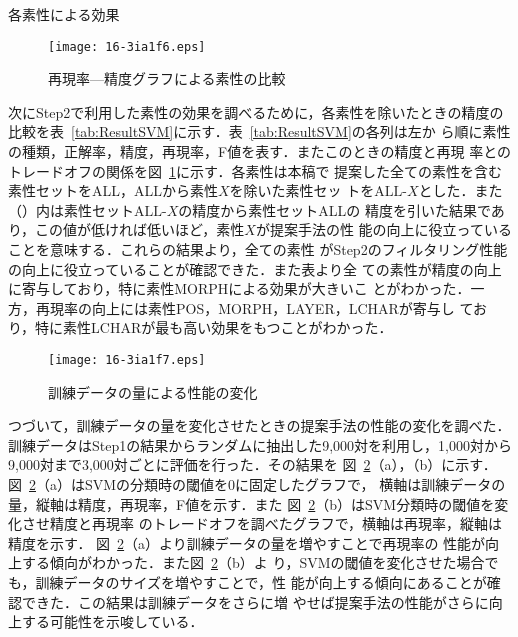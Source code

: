 \documentclass[japanese]{jnlp_1.4}
\begin{document}
\begin{table}[p]
    \caption{各素性による効果}
    \label{tab:ResultSVM}

\end{table}
\begin{figure}[p]
\begin{center}
\texttt{[image: 16-3ia1f6.eps]}
\end{center}
    \caption{再現率—精度グラフによる素性の比較}
    \label{fig:rp_feature}
\end{figure}

次にStep2で利用した素性の効果を調べるために，各素性を除いたときの精度の
比較を表~\ref{tab:ResultSVM}に示す．表~\ref{tab:ResultSVM}の各列は左か
ら順に素性の種類，正解率，精度，再現率，F値を表す．またこのときの精度と再現
率とのトレードオフの関係を図~\ref{fig:rp_feature}に示す．各素性は本稿で
提案した全ての素性を含む素性セットをALL，ALLから素性$X$を除いた素性セッ
トを$\text{ALL-}X$とした．また（）内は素性セット$\text{ALL-}X$の精度から素性セットALLの
精度を引いた結果であり，この値が低ければ低いほど，素性$X$が提案手法の性
能の向上に役立っていることを意味する．これらの結果より，全ての素性
がStep2のフィルタリング性能の向上に役立っていることが確認できた．また表より全
ての素性が精度の向上に寄与しており，特に素性MORPHによる効果が大きいこ
とがわかった．一方，再現率の向上には素性POS，MORPH，LAYER，LCHARが寄与し
ており，特に素性LCHARが最も高い効果をもつことがわかった．


\begin{figure}[b]
\begin{center}
\texttt{[image: 16-3ia1f7.eps]}
\end{center}
    \caption{訓練データの量による性能の変化}
    \label{fig:learning_curve}
\end{figure}

つづいて，訓練データの量を変化させたときの提案手法の性能の変化を調べた．
訓練データはStep1の結果からランダムに抽出した9,000対を利用し，1,000対から9,000対まで3,000対ごとに評価を行った．その結果を
図~\ref{fig:learning_curve}（a），（b）に示す．
図~\ref{fig:learning_curve}（a）はSVMの分類時の閾値を0に固定したグラフで，
横軸は訓練データの量，縦軸は精度，再現率，F値を示す．また
図~\ref{fig:learning_curve}（b）はSVM分類時の閾値を変化させ精度と再現率
のトレードオフを調べたグラフで，横軸は再現率，縦軸は精度を示す．
図~\ref{fig:learning_curve}（a）より訓練データの量を増やすことで再現率の
性能が向上する傾向がわかった．また図~\ref{fig:learning_curve}（b）よ
り，SVMの閾値を変化させた場合でも，訓練データのサイズを増やすことで，性
能が向上する傾向にあることが確認できた．この結果は訓練データをさらに増
やせば提案手法の性能がさらに向上する可能性を示唆している．
\end{document}
